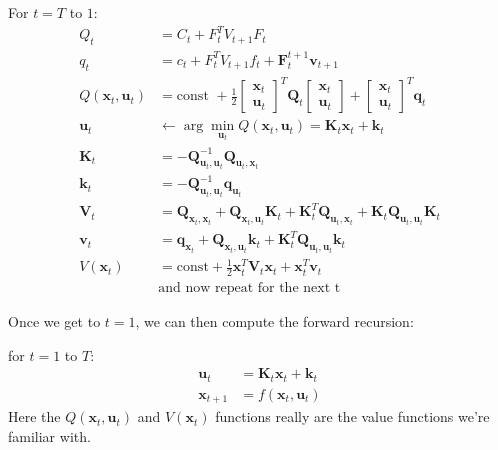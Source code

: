 \documentclass{report}
\newcommand{\argmin}{\arg\!\min}
\begin{document}
For $ t=T  $ to $ 1  $:
\begin{align}
Q_{ t } &= C_{ t } + F_{ t }^{T}V_{ t+1 }F_{ t }\\
q_{ t } &= c_{ t } + F_{ t }^{T}V_{ t+1 }f_{ t } + \bm{F}_{t}^{ t+1 }\bm{v}_{t+1}\\
Q (\bm{x}_{t}, \bm{u}_{t}) &= \text{const } + \frac{1}{2} 
\begin{bmatrix} \bm{x}_{t} \\ \bm{u}_{t} \end{bmatrix}^{ T } \bm{Q}_{ t }
\begin{bmatrix} \bm{x}_{t} \\ \bm{u}_{t} \end{bmatrix} 
+\begin{bmatrix} \bm{x}_{t} \\ \bm{u}_{t} \end{bmatrix}^{ T }\bm{q}_{t} \\
\bm{u}_{t} &\leftarrow \argmin_{\bm{u}_{t}} Q (\bm{x}_{t}, \bm{u}_{t} ) =
\bm{K}_{t} \bm{x}_{t} + \bm{k}_{t}\\
\bm{K}_{t} &= - \bm{Q}_{\bm{u}_{t}, \bm{u}_{t}}^{-1 } \bm{Q}_{\bm{u}_{t}, \bm{x}_{t}} \\
\bm{k}_{t} &= - \bm{Q}_{\bm{u}_{t}, \bm{u}_{t}}^{-1 } \bm{q}_{\bm{u}_{t}}\\
\bm{V}_{t} &=
\bm{Q}_{\bm{x}_{t}, \bm{x}_{t}} + \bm{Q}_{\bm{x}_{t}, \bm{u}_{t}} \bm{K}_{t} +
\bm{K}_{t}^{ T } \bm{Q}_{\bm{u}_{t}, \bm{x}_{t}} +
\bm{K}_{t} \bm{Q}_{\bm{u}_{t}, \bm{u}_{t}}\bm{K}_{t} \\
\bm{v}_{t} &=
\bm{q}_{\bm{x}_{t}} + \bm{Q}_{\bm{x}_{t}, \bm{u}_{t}} \bm{k}_{t} +
\bm{K}_{t}^{ T } \bm{Q}_{\bm{u}_{t}, \bm{u}_{t}} \bm{k}_{t} \\
V (\bm{x}_{t}) &= \text{const} + \frac{1}{2} 
\bm{x}_{t}^{ T } \bm{V}_{t}\bm{x}_{t} +\bm{x}_{t}^{ T }\bm{v}_{t}\\
& \text{and now repeat for the next t}
\end{align}

Once we get to $ t=1  $, we
can then compute the forward recursion:

for $ t=1  $ to $ T  $:
\begin{align}
		\bm{u}_{t} &= \bm{K}_{t}\bm{x}_{t} + \bm{k}_{t} \\
		\bm{x}_{t+1} &= f (\bm{x}_{t}, \bm{u}_{t} )
\end{align}
Here the $ Q (\bm{x}_{t}, \bm{u}_{t} ) $ and $ V (\bm{x}_{t})  $ functions really are the
value functions we're familiar with.
\end{document}
